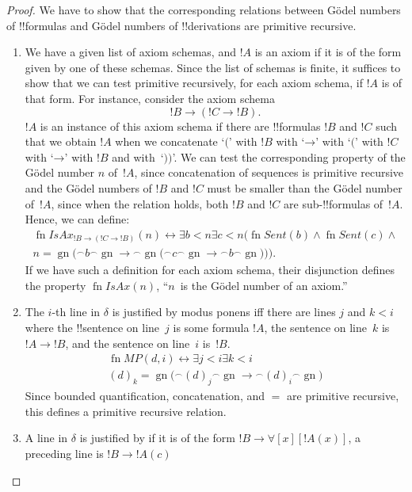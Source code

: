 \documentclass[10pt,a4paper]{article}
\theoremstyle{plain}
\theoremstyle{definition}
\theoremstyle{remark}
\providecommand{\lif}{\mathbin{\rightarrow}}
\providecommand{\lforall}{\mathord{\forall}}
\providecommand{\concat}{\mathbin{{}^\frown}}
\providecommand{\Gn}{\operatorname{gn}}
\providecommand{\bexists}{\exists}
\providecommand{\QR}{\mathrm{QR}}
\providecommand{\defiff}{\mathrel{\leftrightarrow}}
\providecommand{\fn}{\operatorname{fn}}
\begin{document}
\begin{proof}
We have to show that the corresponding relations between G\"odel
numbers of !!{formula}s and  G\"odel numbers of !!{derivation}s 
are primitive recursive.
\begin{enumerate}
\item We have a given list of axiom schemas, and $!A$ is an axiom if
  it is of the form given by one of these schemas.  Since the list of
  schemas is finite, it suffices to show that we can test primitive
  recursively, for each axiom schema, if $!A$ is of that form. For
  instance, consider the axiom schema
  \[
  !B \lif (!C \lif !B).
  \]
  $!A$ is an instance of this axiom schema if there are !!{formula}s
  $!B$ and $!C$ such that we obtain $!A$ when we concatenate `$($'
  with $!B$ with `$\lif$' with `$($' with $!C$ with `$\lif$' with $!B$
  and with~`$))$'. We can test the corresponding property of the
  G\"odel number $n$ of~$!A$, since concatenation of sequences is
  primitive recursive and the G\"odel numbers of $!B$ and $!C$ must
  be smaller than the G\"odel number of~$!A$, since when the relation
  holds, both $!B$ and $!C$ are sub-!!{formula}s of~$!A$. Hence, we
  can define:
  \begin{multline*}
  \fn{IsAx}_{!B \lif (!C \lif !B)}(n) \defiff \bexists{b< n}{
    \bexists{c < n}{(\fn{Sent}(b) \land \fn{Sent}(c) \land {}}}\\ n =
  \Gn{(} \concat b \concat \Gn{\lif} \concat \Gn{(} \concat c \concat
  \Gn{\lif} \concat b \concat \Gn{))}).
  \end{multline*}
  If we have such a definition for each axiom schema, their
  disjunction defines the property $\fn{IsAx}(n)$, ``$n$~is the
  G\"odel number of an axiom.''
\item The $i$-th line in $\delta$ is justified by modus ponens iff there
  are lines $j$ and $k < i$ where the !!{sentence} on line~$j$ is some
  formula $!A$, the sentence on line~$k$ is $!A \lif !B$, and the
  sentence on line~$i$ is~$!B$.
  \begin{multline*}
    \fn{MP}(d, i) \defiff \bexists{j < i}{\bexists{k < i}{}}\\
    (d)_k = \Gn{(} \concat (d)_j
      \concat \Gn{\lif} \concat (d)_i \concat \Gn{)}
  \end{multline*}
  Since bounded quantification, concatenation, and $=$ are primitive
  recursive, this defines a primitive recursive relation. 
\item A line in $\delta$ is justified by \QR{} if it is of the form
  $!B \lif \lforall[x][!A(x)]$, a preceding line is $!B \lif !A(c)$

\end{enumerate}
\end{proof}
\end{document}
